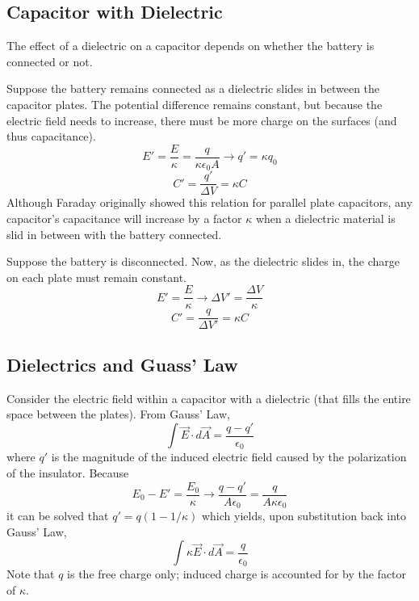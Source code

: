 \documentclass[../PhysicsFormulae]{subfiles}
\begin{document}
\subsection{Capacitor with Dielectric}
The effect of a dielectric on a capacitor depends on whether the battery is connected or not. \bigskip

Suppose the battery remains connected as a dielectric slides in between the capacitor plates. The potential difference remains constant, but because the electric field needs to increase, there must be more charge on the surfaces (and thus capacitance). 
\[ E' = \frac{E}{\kappa} = \frac{q}{\kappa \epsilon_0 A} \rightarrow q' = \kappa q_0 \]
\[ C' = \frac{q'}{\Delta V} = \kappa C \]
Although Faraday originally showed this relation for parallel plate capacitors, any capacitor's capacitance will increase by a factor $\kappa$ when a dielectric material is slid in between with the battery connected. \bigskip

Suppose the battery is disconnected. Now, as the dielectric slides in, the charge on each plate must remain constant. 
\[ E' = \frac{E}{\kappa} \rightarrow \Delta V' = \frac{\Delta V}{\kappa} \]
\[ C' = \frac{q}{\Delta V'} = \kappa C \] 

\subsection{Dielectrics and Guass' Law}
Consider the electric field within a capacitor with a dielectric (that fills the entire space between the plates). From Gauss' Law, 
\[ \int \vec{E} \cdot d\vec{A} = \frac{q - q'}{\epsilon_0} \]
where $q'$ is the magnitude of the induced electric field caused by the polarization of the insulator. Because 
\[ E_0 - E' = \frac{E_0}{\kappa} \rightarrow \frac{q - q'}{A\epsilon_0} = \frac{q}{A \kappa \epsilon_0} \]
it can be solved that $q' = q(1 - 1/\kappa)$ which yields, upon substitution back into Gauss' Law, 
\[ \int \kappa \vec{E} \cdot d\vec{A} = \frac{q}{\epsilon_0} \]
Note that $q$ is the free charge only; induced charge is accounted for by the factor of $\kappa$. 
\end{document}
